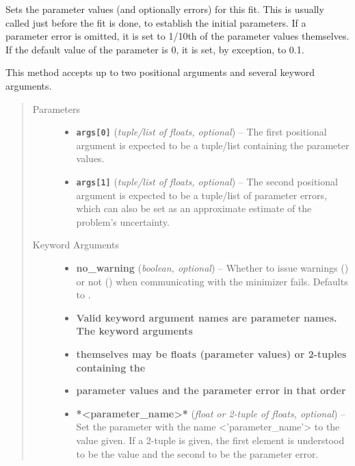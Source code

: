 \documentclass[a4paper,10pt,english]{sphinxmanual}
\begin{document}
\begin{fulllineitems}

\begin{fulllineitems}
\label{module_doc:kafe.fit.Fit.set_parameters}
Sets the parameter values (and optionally errors) for this fit.
This is usually called just before the fit is done, to establish
the initial parameters. If a parameter error is omitted, it is
set to 1/10th of the parameter values themselves. If the default
value of the parameter is 0, it is set, by exception, to 0.1.

This method accepts up to two positional arguments and several
keyword arguments.
\begin{quote}\begin{description}
\item[{Parameters}] \leavevmode\begin{itemize}
\item {} 
\textbf{\texttt{args{[}0{]}}} (\emph{tuple/list of floats, optional}) -- The first positional argument is expected to be
a tuple/list containing the parameter values.

\item {} 
\textbf{\texttt{args{[}1{]}}} (\emph{tuple/list of floats, optional}) -- The second positional argument is expected to be a
tuple/list of parameter errors, which can also be set as an
approximate estimate of the problem's uncertainty.

\end{itemize}

\item[{Keyword Arguments}] \leavevmode\begin{itemize}
\item {} 
\textbf{no\_warning} (\emph{boolean, optional}) --
Whether to issue warnings () or not () when
communicating with the minimizer fails. Defaults to .

\item {} 
\textbf{Valid keyword argument names are parameter names. The keyword arguments}

\item {} 
\textbf{themselves may be floats (parameter values) or 2-tuples containing the}

\item {} 
\textbf{parameter values and the parameter error in that order}

\item {} 
\textbf{*\textless{}parameter\_name\textgreater{}*} (\emph{float or 2-tuple of floats, optional}) --
Set the parameter with the name \textless{}'parameter\_name'\textgreater{} to the value
given. If a 2-tuple is given, the first element is understood
to be the value and the second to be the parameter error.


\end{itemize}
\end{description}
\end{quote}
\end{fulllineitems}
\end{fulllineitems}
\end{document}
